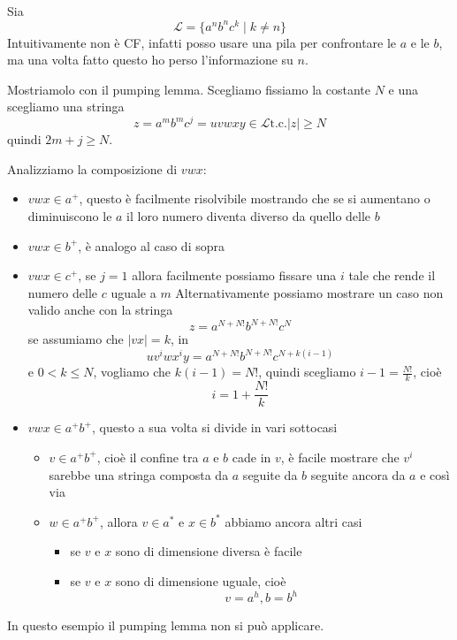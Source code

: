 \documentclass[12pt]{report}
\theoremstyle{definition}
\begin{document}
\begin{tcolorbox}[breakable]
Sia
$$ \mathcal{L} = \{ a^n b^n c^k \mid k \neq n \} $$
Intuitivamente non è CF, infatti posso usare una pila per confrontare le $a$ e le $b$, ma una volta fatto questo ho perso l'informazione su $n$.

Mostriamolo con il pumping lemma. 
Scegliamo fissiamo la costante $N$ e una scegliamo una stringa
	$$ z = a^m b^m c^j = u v w x y  \in \mathcal{L} \text{t.c.} |z| \geq N $$
quindi $2m + j \geq N$.

Analizziamo la composizione di $vwx$:
\begin{itemize}
	\item $vwx \in a^+$, questo è facilmente risolvibile mostrando che se si aumentano o diminuiscono le $a$ il loro numero diventa diverso da quello delle $b$
	\item $vwx \in b^+$, è analogo al caso di sopra
	\item $vwx \in c^+$, se $j = 1$ allora facilmente possiamo fissare una $i$ tale che rende il numero delle $c$ uguale a $m$
		Alternativamente possiamo mostrare un caso non valido anche con la stringa 
		$$ z = a^{N + N!} b^{N + N!} c^N $$
		se assumiamo che $|vx| = k$, in
		$$ u v^i w x^i y = a^{N + N!} b^{N + N!} c^{N + k(i - 1)} $$
		e $0 < k \leq N$, vogliamo che $k(i - 1) = N!$, quindi scegliamo $i - 1 = \frac{N!}{k}$, cioè
		$$ i = 1 + \frac{N!}{k} $$
	\item $vwx \in a^+b^+$, questo a sua volta si divide in vari sottocasi
		\begin{itemize}
			\item $v \in a^+ b^+$, cioè il confine tra $a$ e $b$ cade in $v$, è facile mostrare che $v^i$ sarebbe una stringa composta da $a$ seguite da $b$ seguite ancora da $a$ e così via
			\item $w \in a^+ b^+$, allora $v \in a^*$ e $x \in b^*$ abbiamo ancora altri casi
				\begin{itemize}
					\item se $v$ e $x$ sono di dimensione diversa è facile
					\item se $v$ e $x$ sono di dimensione uguale, cioè
						$$ v = a^h, b = b^h $$
				\end{itemize}
		\end{itemize}
\end{itemize}
In questo esempio il pumping lemma non si può applicare. %

\end{tcolorbox}
\end{document}

